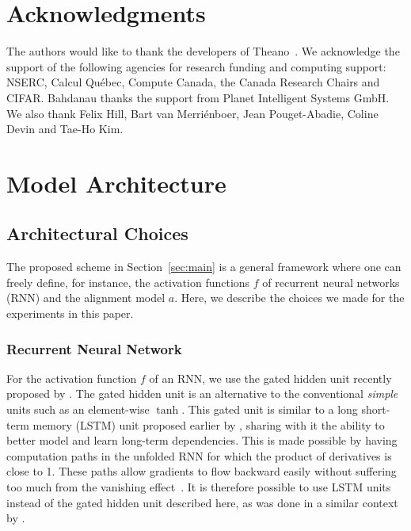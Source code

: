 \documentclass{article} %
\begin{document}
\section*{Acknowledgments}

The authors would like to thank the developers of
Theano~\citep{bergstra+al:2010-scipy,Bastien-Theano-2012}.  We  acknowledge the
support of the following agencies for research funding and computing support:
NSERC, Calcul Qu\'{e}bec, Compute Canada, the Canada Research Chairs and CIFAR.
Bahdanau thanks the support from Planet Intelligent Systems GmbH.  We also thank
Felix Hill, Bart van Merri\'enboer, Jean Pouget-Abadie, Coline Devin and
Tae-Ho Kim. 






\newpage
\appendix
\section{Model Architecture}
\label{sec:model_detail}

\subsection{Architectural Choices}

The proposed scheme in Section~\ref{sec:main} is a general framework where one
can freely define, for instance, the activation functions $f$ of recurrent
neural networks (RNN) and the alignment model $a$. Here, we describe the
choices we made for the experiments in this paper. 

\subsubsection{Recurrent Neural Network}
\label{sec:gatedrnn}

For the activation function $f$ of an RNN, we use the gated hidden unit
recently proposed by \citet{Cho2014}. The gated hidden unit is an alternative
to the conventional {\it simple} units such as an element-wise $\tanh$.  This
gated unit is similar to a long short-term memory (LSTM) unit proposed earlier
by \citet{Hochreiter+Schmidhuber-1997}, sharing with it the ability to better
model and learn long-term dependencies. This is made possible by having
computation paths in the unfolded RNN for which the product of derivatives is
close to 1.  These paths allow gradients to flow backward easily without
suffering too much from the vanishing
effect~\citep{Hochreiter91,Bengio-trnn93,Pascanu+al-ICML2013-small}. It is
therefore possible to use LSTM units instead of the gated hidden unit described
here, as was done in a similar context by \citet{Sutskever2014}.
\end{document}
